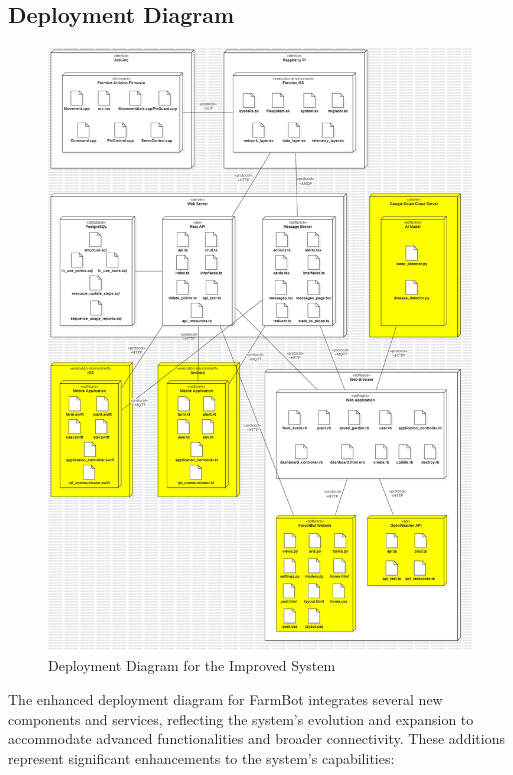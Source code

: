 \subsection{Deployment Diagram}
\begin{figure}[htbp]
    \centering
    \includegraphics[width=0.7\linewidth]{Figures/improved_deployment_diagram.jpg}
    \caption{Deployment Diagram for the Improved System}
    \label{DeploymentImproved}
\end{figure}
\newpage
The enhanced deployment diagram for FarmBot integrates several new components and services, reflecting the system's evolution and expansion to accommodate advanced functionalities and broader connectivity. These additions represent significant enhancements to the system’s capabilities:
